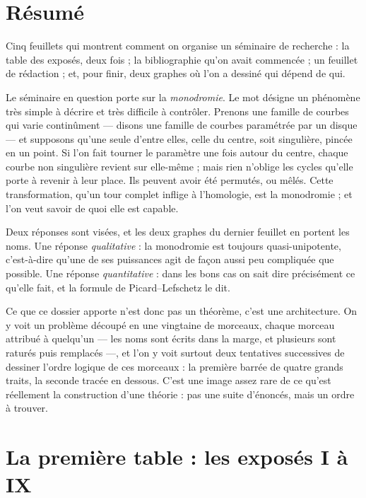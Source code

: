 \documentclass[11pt,a4paper]{article}
\begin{document}
\section*{Résumé}

\begin{resume}
Cinq feuillets qui montrent comment on organise un séminaire de recherche : la
table des exposés, deux fois ; la bibliographie qu'on avait commencée ; un
feuillet de rédaction ; et, pour finir, deux graphes où l'on a dessiné qui
dépend de qui.

Le séminaire en question porte sur la \emph{monodromie}. Le mot désigne un
phénomène très simple à décrire et très difficile à contrôler. Prenons une
famille de courbes qui varie continûment --- disons une famille de courbes
paramétrée par un disque --- et supposons qu'une seule d'entre elles, celle du
centre, soit singulière, pincée en un point. Si l'on fait tourner le paramètre
une fois autour du centre, chaque courbe non singulière revient sur elle-même ;
mais rien n'oblige les cycles qu'elle porte à revenir à leur place. Ils
peuvent avoir été permutés, ou mêlés. Cette transformation, qu'un tour complet
inflige à l'homologie, est la monodromie ; et l'on veut savoir de quoi elle est
capable.

Deux réponses sont visées, et les deux graphes du dernier feuillet en portent
les noms. Une réponse \emph{qualitative} : la monodromie est toujours
quasi-unipotente, c'est-à-dire qu'une de ses puissances agit de façon aussi peu
compliquée que possible. Une réponse \emph{quantitative} : dans les bons cas on
sait dire précisément ce qu'elle fait, et la formule de Picard--Lefschetz le
dit.

Ce que ce dossier apporte n'est donc pas un théorème, c'est une architecture.
On y voit un problème découpé en une vingtaine de morceaux, chaque morceau
attribué à quelqu'un --- les noms sont écrits dans la marge, et plusieurs sont
raturés puis remplacés ---, et l'on y voit surtout deux tentatives successives
de dessiner l'ordre logique de ces morceaux : la première barrée de quatre
grands traits, la seconde tracée en dessous. C'est une image assez rare de ce
qu'est réellement la construction d'une théorie : pas une suite d'énoncés, mais
un ordre à trouver.

\end{resume}

\section*{La première table : les exposés I à IX}
\end{document}

